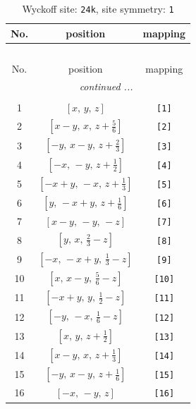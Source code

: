 \documentclass[fleqn,8pt]{jsarticle}
\begin{document}
\begin{longtable}{ccc}
\caption{Wyckoff site: {\tt 24k}, site symmetry: {\tt 1}}
 \\
 \hline \hline
No. & position & mapping \\ \hline \endfirsthead

\multicolumn{2}{l}{\tablename\ \thetable{}} \\
 \hline \hline
No. & position & mapping \\ \hline \endhead

 \hline \hline
\multicolumn{2}{r}{\footnotesize\it continued ...} \\ \endfoot

 \hline \hline
\multicolumn{2}{r}{} \\ \endlastfoot

1 & $\left[ x,\, y,\, z \right]$ & {\tt [1]} \\ \hline
2 & $\left[ x - y,\, x,\, z + \frac{5}{6} \right]$ & {\tt [2]} \\ \hline
3 & $\left[ - y,\, x - y,\, z + \frac{2}{3} \right]$ & {\tt [3]} \\ \hline
4 & $\left[ - x,\, - y,\, z + \frac{1}{2} \right]$ & {\tt [4]} \\ \hline
5 & $\left[ - x + y,\, - x,\, z + \frac{1}{3} \right]$ & {\tt [5]} \\ \hline
6 & $\left[ y,\, - x + y,\, z + \frac{1}{6} \right]$ & {\tt [6]} \\ \hline
7 & $\left[ x - y,\, - y,\, - z \right]$ & {\tt [7]} \\ \hline
8 & $\left[ y,\, x,\, \frac{2}{3} - z \right]$ & {\tt [8]} \\ \hline
9 & $\left[ - x,\, - x + y,\, \frac{1}{3} - z \right]$ & {\tt [9]} \\ \hline
10 & $\left[ x,\, x - y,\, \frac{5}{6} - z \right]$ & {\tt [10]} \\ \hline
11 & $\left[ - x + y,\, y,\, \frac{1}{2} - z \right]$ & {\tt [11]} \\ \hline
12 & $\left[ - y,\, - x,\, \frac{1}{6} - z \right]$ & {\tt [12]} \\ \hline
13 & $\left[ x,\, y,\, z + \frac{1}{2} \right]$ & {\tt [13]} \\ \hline
14 & $\left[ x - y,\, x,\, z + \frac{1}{3} \right]$ & {\tt [14]} \\ \hline
15 & $\left[ - y,\, x - y,\, z + \frac{1}{6} \right]$ & {\tt [15]} \\ \hline
16 & $\left[ - x,\, - y,\, z \right]$ & {\tt [16]} \\ \hline

\end{longtable}
\end{document}
